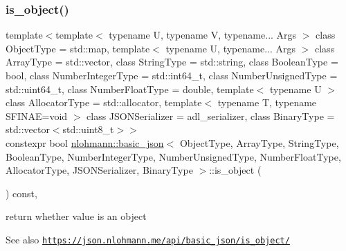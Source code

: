 \subsubsection{\texorpdfstring{is\+\_\+object()}{is\_object()}}
{\footnotesize\ttfamily template$<$template$<$ typename U, typename V, typename... Args $>$ class Object\+Type = std\+::map, template$<$ typename U, typename... Args $>$ class Array\+Type = std\+::vector, class String\+Type  = std\+::string, class Boolean\+Type  = bool, class Number\+Integer\+Type  = std\+::int64\+\_\+t, class Number\+Unsigned\+Type  = std\+::uint64\+\_\+t, class Number\+Float\+Type  = double, template$<$ typename U $>$ class Allocator\+Type = std\+::allocator, template$<$ typename T, typename S\+F\+I\+N\+A\+E=void $>$ class J\+S\+O\+N\+Serializer = adl\+\_\+serializer, class Binary\+Type  = std\+::vector$<$std\+::uint8\+\_\+t$>$$>$ \\
constexpr bool \hyperlink{classnlohmann_1_1basic__json}{nlohmann\+::basic\+\_\+json}$<$ Object\+Type, Array\+Type, String\+Type, Boolean\+Type, Number\+Integer\+Type, Number\+Unsigned\+Type, Number\+Float\+Type, Allocator\+Type, J\+S\+O\+N\+Serializer, Binary\+Type $>$\+::is\+\_\+object (\begin{DoxyParamCaption}{ }\end{DoxyParamCaption}) const\hspace{0.3cm}{\ttfamily [inline]}, {\ttfamily [noexcept]}}



return whether value is an object 

\begin{DoxySeeAlso}{See also}
\href{https://json.nlohmann.me/api/basic_json/is_object/}{\tt https\+://json.\+nlohmann.\+me/api/basic\+\_\+json/is\+\_\+object/} 
\end{DoxySeeAlso}
\mbox{\label{classnlohmann_1_1basic__json_a548d2d4013da24e7d7510d90febc80c4}} 

